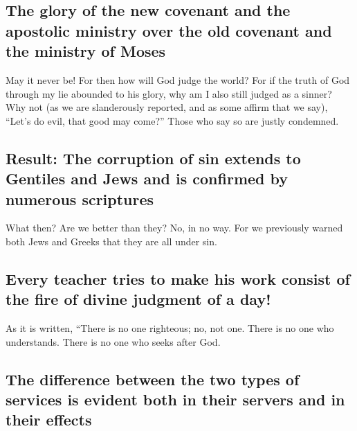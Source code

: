 \hypertarget{the-glory-of-the-new-covenant-and-the-apostolic-ministry-over-the-old-covenant-and-the-ministry-of-moses}{%
\subsection{The glory of the new covenant and the apostolic ministry
over the old covenant and the ministry of
Moses}\label{the-glory-of-the-new-covenant-and-the-apostolic-ministry-over-the-old-covenant-and-the-ministry-of-moses}}

 May it never be! For then how will God judge the world?
 For if the truth of God through my lie abounded to his
glory, why am I also still judged as a sinner?  Why not
(as we are slanderously reported, and as some affirm that we say),
``Let's do evil, that good may come?'' Those who say so are justly
condemned.

\hypertarget{result-the-corruption-of-sin-extends-to-gentiles-and-jews-and-is-confirmed-by-numerous-scriptures}{%
\subsection{Result: The corruption of sin extends to Gentiles and Jews
and is confirmed by numerous
scriptures}\label{result-the-corruption-of-sin-extends-to-gentiles-and-jews-and-is-confirmed-by-numerous-scriptures}}

 What then? Are we better than they? No, in no way. For we
previously warned both Jews and Greeks that they are all under sin.

\hypertarget{every-teacher-tries-to-make-his-work-consist-of-the-fire-of-divine-judgment-of-a-day}{%
\subsection{Every teacher tries to make his work consist of the fire of
divine judgment of a
day!}\label{every-teacher-tries-to-make-his-work-consist-of-the-fire-of-divine-judgment-of-a-day}}

 As it is written, ``There is no one righteous; no, not
one.  There is no one who understands. There is no one
who seeks after God.

\hypertarget{the-difference-between-the-two-types-of-services-is-evident-both-in-their-servers-and-in-their-effects}{%
\subsection{The difference between the two types of services is evident
both in their servers and in their
effects}\label{the-difference-between-the-two-types-of-services-is-evident-both-in-their-servers-and-in-their-effects}}

